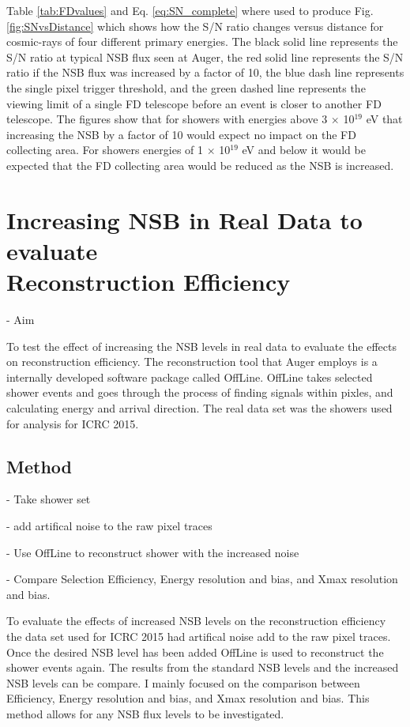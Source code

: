 Table \ref{tab:FDvalues} and Eq. \ref{eq:SN_complete} where used to produce Fig. \ref{fig:SNvsDistance} which shows how the S/N ratio changes versus distance for cosmic-rays of four different primary energies. The black solid line represents the S/N ratio at typical NSB flux seen at Auger, the red solid line represents the S/N ratio if the NSB flux was increased by a factor of 10, the blue dash line represents the single pixel trigger threshold, and the green dashed line represents the viewing limit of a single FD telescope before an event is closer to another FD telescope. The figures show that for showers with energies above 3 $\times$ 10$^{19}$ eV that increasing the NSB by a factor of 10 would expect no impact on the FD collecting area. For showers energies of 1 $\times$ 10$^{19}$ eV and below it would be expected that the FD collecting area would be reduced as the NSB is increased.



\section{Increasing NSB in Real Data to evaluate \\ Reconstruction Efficiency}


- Aim

To test the effect of increasing the NSB levels in real data to evaluate the effects on reconstruction efficiency. The reconstruction tool that Auger employs is a internally developed software package called OffLine. OffLine takes selected shower events and goes through the process of finding signals within pixles, and calculating energy and arrival direction. The real data set was the showers used for analysis for ICRC 2015. 

\subsection{Method}

- Take shower set

- add artifical noise to the raw pixel traces

- Use OffLine to reconstruct shower with the increased noise

- Compare Selection Efficiency, Energy resolution and bias, and Xmax resolution and bias.

To evaluate the effects of increased NSB levels on the reconstruction efficiency the data set used for ICRC 2015 had artifical noise add to the raw pixel traces. Once the desired NSB level has been added OffLine is used to reconstruct the shower events again. The results from the standard NSB levels and the increased NSB levels can be compare. I mainly focused on the comparison between Efficiency, Energy resolution and bias, and Xmax resolution and bias. This method allows for any NSB flux levels to be investigated.


